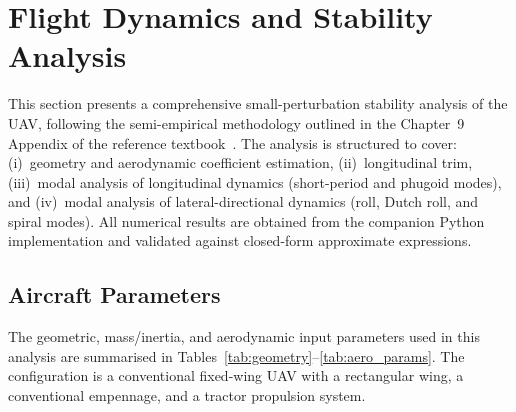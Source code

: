 %

\section{Flight Dynamics and Stability Analysis}
\label{sec:flight_dynamics}

This section presents a comprehensive small-perturbation stability analysis of the UAV, following the semi-empirical methodology outlined in the Chapter~9 Appendix of the reference textbook~\cite{ref_textbook}. The analysis is structured to cover: (i)~geometry and aerodynamic coefficient estimation, (ii)~longitudinal trim, (iii)~modal analysis of longitudinal dynamics (short-period and phugoid modes), and (iv)~modal analysis of lateral-directional dynamics (roll, Dutch roll, and spiral modes). All numerical results are obtained from the companion Python implementation and validated against closed-form approximate expressions.

\subsection{Aircraft Parameters}
\label{subsec:parameters}

The geometric, mass/inertia, and aerodynamic input parameters used in this analysis are summarised in Tables~\ref{tab:geometry}--\ref{tab:aero_params}. The configuration is a conventional fixed-wing UAV with a rectangular wing, a conventional empennage, and a tractor propulsion system.

